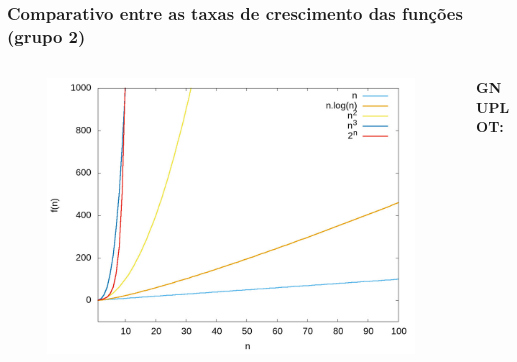 \documentclass[aspectratio=169]{beamer}
\begin{document}
\begin{frame}\frametitle{Comparativo entre as taxas de crescimento das funções (grupo 2)}
\vspace{-5mm}
\begin{columns}[T]
\begin{column}{0.5\linewidth}
\begin{figure}[h]
	\centering
	\includegraphics[height=0.65\paperheight]{graficos/grupo2.jpg}
\end{figure}
\end{column}
\begin{column}{0.5\linewidth}
\vspace{5mm}
{\fontsize{0}{4}\selectfont{}\textbf{GNUPLOT:}

}
\end{column}
\end{columns}
\end{frame}
\end{document}

